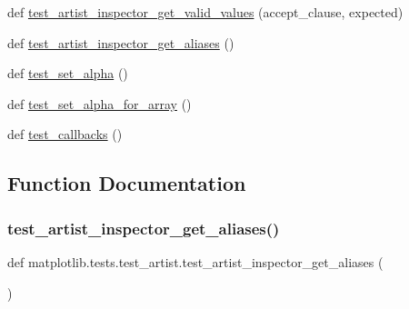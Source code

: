 \begin{DoxyCompactItemize}
\item 
def \hyperlink{namespacematplotlib_1_1tests_1_1test__artist_a7882e0aeceeda691a5bb3453322c1ac5}{test\+\_\+artist\+\_\+inspector\+\_\+get\+\_\+valid\+\_\+values} (accept\+\_\+clause, expected)
\item 
def \hyperlink{namespacematplotlib_1_1tests_1_1test__artist_a734dc9d8c1ea058c5d6481f2754e54f9}{test\+\_\+artist\+\_\+inspector\+\_\+get\+\_\+aliases} ()
\item 
def \hyperlink{namespacematplotlib_1_1tests_1_1test__artist_a84803e415be433ccb1ec3202c2b43037}{test\+\_\+set\+\_\+alpha} ()
\item 
def \hyperlink{namespacematplotlib_1_1tests_1_1test__artist_a9c65559cd0cae627a710b9f7f2b5f9b5}{test\+\_\+set\+\_\+alpha\+\_\+for\+\_\+array} ()
\item 
def \hyperlink{namespacematplotlib_1_1tests_1_1test__artist_ae29ca54113cb595f93aa2781b95817e6}{test\+\_\+callbacks} ()
\end{DoxyCompactItemize}


\subsection{Function Documentation}
\mbox{\label{namespacematplotlib_1_1tests_1_1test__artist_a734dc9d8c1ea058c5d6481f2754e54f9}} 
\subsubsection{\texorpdfstring{test\+\_\+artist\+\_\+inspector\+\_\+get\+\_\+aliases()}{test\_artist\_inspector\_get\_aliases()}}
{\footnotesize\ttfamily def matplotlib.\+tests.\+test\+\_\+artist.\+test\+\_\+artist\+\_\+inspector\+\_\+get\+\_\+aliases (\begin{DoxyParamCaption}{ }\end{DoxyParamCaption})}

\mbox{\label{namespacematplotlib_1_1tests_1_1test__artist_a7882e0aeceeda691a5bb3453322c1ac5}} 
